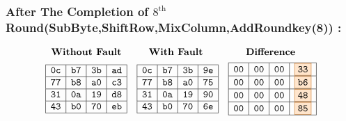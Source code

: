\subsubsection{After The Completion of $8^{\text{th}}$ Round(SubByte,ShiftRow,MixColumn,AddRoundkey(8)) :}
\[
\begin{array}{ccc}
\textbf{Without Fault} & \textbf{With Fault } & \textbf{Difference } \\[1ex]
\begin{array}{|c|c|c|c|}
\hline
\texttt{0c} & \texttt{b7} & \texttt{3b} & \texttt{ad} \\
\hline
\texttt{77} & \texttt{b8} & \texttt{a0} & \texttt{c3} \\
\hline
\texttt{31} & \texttt{0a} & \texttt{19} & \texttt{d8} \\
\hline
\texttt{43} & \texttt{b0} & \texttt{70} & \texttt{eb} \\
\hline
\end{array} 
&

\begin{array}{|c|c|c|c|}
    \hline
\texttt{0c} & \texttt{b7} & \texttt{3b} & \texttt{9e} \\
\hline
\texttt{77} & \texttt{b8} & \texttt{a0} & \texttt{75} \\
\hline
\texttt{31} & \texttt{0a} & \texttt{19} & \texttt{90} \\
\hline
\texttt{43} & \texttt{b0} & \texttt{70} & \texttt{6e} \\
\hline
    \end{array}

    &

\begin{array}{|c|c|c|c|}
    \hline
    \texttt{00} & \texttt{00} & \texttt{00} & \fcolorbox{orange!80!black}{orange!20}{\texttt{33}} \\
    \hline
    \texttt{00} & \texttt{00} & \texttt{00} & \fcolorbox{orange!80!black}{orange!20}{\texttt{b6}} \\
    \hline
    \texttt{00} & \texttt{00} & \texttt{00} & \fcolorbox{orange!80!black}{orange!20}{\texttt{48}} \\
    \hline
    \texttt{00} & \texttt{00} & \texttt{00} & \fcolorbox{orange!80!black}{orange!20}{\texttt{85}} \\
    \hline
    \end{array}
\end{array}
\]


